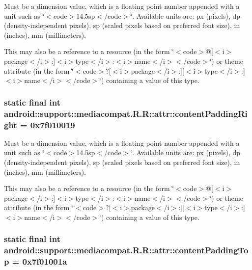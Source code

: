 Must be a dimension value, which is a floating point number appended with a unit such as \char`\"{}$<$code$>$14.5sp$<$/code$>$\char`\"{}. Available units are: px (pixels), dp (density-independent pixels), sp (scaled pixels based on preferred font size), in (inches), mm (millimeters). 

This may also be a reference to a resource (in the form \char`\"{}$<$code$>$@\mbox{[}$<$i$>$package$<$/i$>$:\mbox{]}$<$i$>$type$<$/i$>$:$<$i$>$name$<$/i$>$$<$/code$>$\char`\"{}) or theme attribute (in the form \char`\"{}$<$code$>$?\mbox{[}$<$i$>$package$<$/i$>$:\mbox{]}\mbox{[}$<$i$>$type$<$/i$>$:\mbox{]}$<$i$>$name$<$/i$>$$<$/code$>$\char`\"{}) containing a value of this type. \hypertarget{classandroid_1_1support_1_1mediacompat_1_1_r_1_1attr_77693c18d004d91ae351bbac5f3ad69d}{
\subsubsection[{contentPaddingRight}]{\setlength{\rightskip}{0pt plus 5cm}static final int android::support::mediacompat.R.R::attr::contentPaddingRight = 0x7f010019}}
\label{classandroid_1_1support_1_1mediacompat_1_1_r_1_1attr_77693c18d004d91ae351bbac5f3ad69d}


Must be a dimension value, which is a floating point number appended with a unit such as \char`\"{}$<$code$>$14.5sp$<$/code$>$\char`\"{}. Available units are: px (pixels), dp (density-independent pixels), sp (scaled pixels based on preferred font size), in (inches), mm (millimeters). 

This may also be a reference to a resource (in the form \char`\"{}$<$code$>$@\mbox{[}$<$i$>$package$<$/i$>$:\mbox{]}$<$i$>$type$<$/i$>$:$<$i$>$name$<$/i$>$$<$/code$>$\char`\"{}) or theme attribute (in the form \char`\"{}$<$code$>$?\mbox{[}$<$i$>$package$<$/i$>$:\mbox{]}\mbox{[}$<$i$>$type$<$/i$>$:\mbox{]}$<$i$>$name$<$/i$>$$<$/code$>$\char`\"{}) containing a value of this type. \hypertarget{classandroid_1_1support_1_1mediacompat_1_1_r_1_1attr_37fe8f086de77d5db7a6b2ec5ffe2660}{
\subsubsection[{contentPaddingTop}]{\setlength{\rightskip}{0pt plus 5cm}static final int android::support::mediacompat.R.R::attr::contentPaddingTop = 0x7f01001a}}
\label{classandroid_1_1support_1_1mediacompat_1_1_r_1_1attr_37fe8f086de77d5db7a6b2ec5ffe2660}


